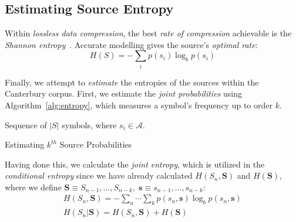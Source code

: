 \documentclass[a4paper, twocolumn]{article}
\begin{document}
        \subsection{Estimating Source Entropy} \label{sec:estimating_source_entropy}

        Within \emph{lossless data compression}, the best \emph{rate of compression} achievable is the \emph{Shannon entropy}~\cite{sayood2012introduction}. Accurate modelling gives the source's \emph{optimal rate}:
        \begin{equation} \label{eq:entropy}
            H(S) = -\sum_i p(s_i) \log_b p(s_i)
        \end{equation}

        Finally, we attempt to \emph{estimate} the entropies of the sources within the Canterbury corpus. First, we estimate the \emph{joint probabilities} using Algorithm~\ref{alg:entropy}, which measures a symbol's frequency up to order \(k\).

        \begin{algorithm}
            \begin{algorithmic}
                \REQUIRE Sequence of \(|S|\) symbols,\: where \(s_i \in \mathcal{A}.\)
                    \ENDFOR
                \ENDFOR

                \ENDFOR
            \end{algorithmic}
            \caption{Estimating \(k^{th}\) Source Probabilities}
            \label{alg:entropy}
        \end{algorithm}

        Having done this, we calculate the \emph{joint entropy}, which is utilized in the \emph{conditional entropy} since we have already calculated \(H(S_n, \bm{S})\) and \(H(\bm{S})\), where we define \(\bm{S} \equiv S_{n-1}, \dots, S_{n-k},\; \bm{s} \equiv s_{n-1}, \dots, s_{n-k} \):
        \begin{gather} \label{eq:entropies}
            H(S_n, \bm{S}) = - \sum_n \cdots \sum_k p(s_n, \bm{s}) \log_b p(s_n, \bm{s}) \\
            H(S_n | \bm{S}) = H(S_n, \bm{S}) + H(\bm{S})
        \end{gather}
\end{document}
